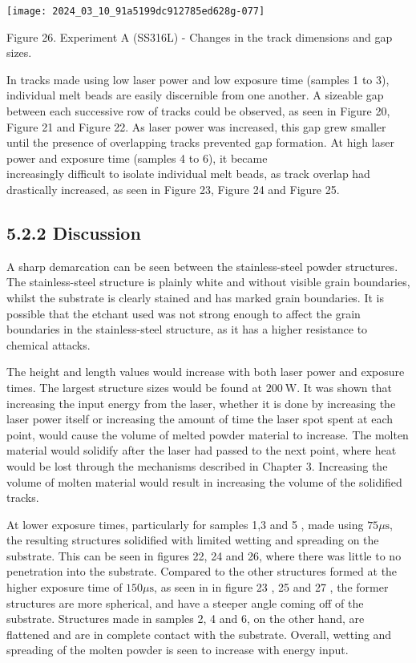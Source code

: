 \documentclass[10pt]{article}
\begin{document}
\begin{center}
\texttt{[image: 2024\_03\_10\_91a5199dc912785ed628g-077]}
\end{center}

Figure 26. Experiment A (SS316L) - Changes in the track dimensions and gap sizes.

In tracks made using low laser power and low exposure time (samples 1 to 3), individual melt beads are easily discernible from one another. A sizeable gap between each successive row of tracks could be observed, as seen in Figure 20, Figure 21 and Figure 22. As laser power was increased, this gap grew smaller until the presence of overlapping tracks prevented gap formation. At high laser power and exposure time (samples 4 to 6), it became\\
increasingly difficult to isolate individual melt beads, as track overlap had drastically increased, as seen in Figure 23, Figure 24 and Figure 25.

\subsection*{5.2.2 Discussion}
A sharp demarcation can be seen between the stainless-steel powder structures. The stainless-steel structure is plainly white and without visible grain boundaries, whilst the substrate is clearly stained and has marked grain boundaries. It is possible that the etchant used was not strong enough to affect the grain boundaries in the stainless-steel structure, as it has a higher resistance to chemical attacks.

The height and length values would increase with both laser power and exposure times. The largest structure sizes would be found at $200 \mathrm{~W}$. It was shown that increasing the input energy from the laser, whether it is done by increasing the laser power itself or increasing the amount of time the laser spot spent at each point, would cause the volume of melted powder material to increase. The molten material would solidify after the laser had passed to the next point, where heat would be lost through the mechanisms described in Chapter 3. Increasing the volume of molten material would result in increasing the volume of the solidified tracks.

At lower exposure times, particularly for samples 1,3 and 5 , made using $75 \mu \mathrm{s}$, the resulting structures solidified with limited wetting and spreading on the substrate. This can be seen in figures 22, 24 and 26, where there was little to no penetration into the substrate. Compared to the other structures formed at the higher exposure time of $150 \mu \mathrm{s}$, as seen in in figure 23 , 25 and 27 , the former structures are more spherical, and have a steeper angle coming off of the substrate. Structures made in samples 2, 4 and 6, on the other hand, are flattened and are in complete contact with the substrate. Overall, wetting and spreading of the molten powder is seen to increase with energy input.
\end{document}

